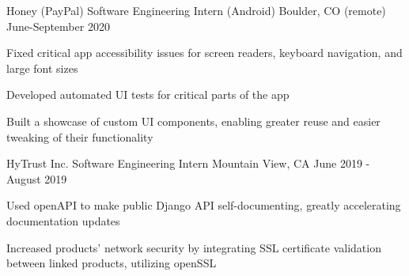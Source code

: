 \documentclass[12pt, a4paper]{awesome-cv}
\begin{document}
\makecvheader


\begin{cventries}

  \cventry
    {Honey (PayPal)}
    {Software Engineering Intern (Android)}
    {Boulder, CO (remote)}
    {June-September 2020}
    {
        \begin{cvitems}
            \item {Fixed critical app accessibility issues for screen readers, keyboard navigation, and large font sizes}
            \item {Developed automated UI tests for critical parts of the app}
            \item {Built a showcase of custom UI components, enabling greater reuse and easier tweaking of their functionality}
        \end{cvitems}
    }

  \cventry
    {HyTrust Inc.}
    {Software Engineering Intern}
    {Mountain View, CA}
    {June 2019 - August 2019}
    {
      \begin{cvitems}
      	\item {Used openAPI to make public Django API self-documenting, greatly accelerating documentation updates}
	      \item {Increased products' network security by integrating SSL certificate validation between linked products, utilizing openSSL}
      \end{cvitems}
    }




\end{cventries}
\end{document}
